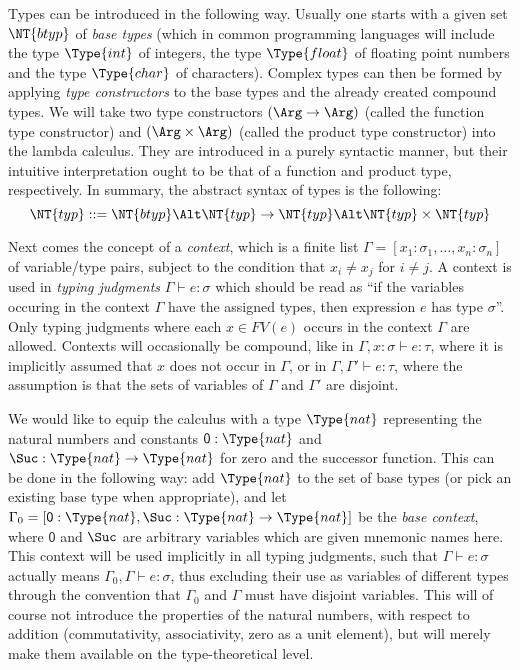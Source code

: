 Types can be introduced in the following way. Usually one starts with a given
set $\NT{btyp}$ of \emph{base types} (which in common programming languages
will include the type $\Type{int}$ of integers, the type $\Type{float}$ of floating point
numbers and the type $\Type{char}$ of characters). Complex types can then be
formed by applying \emph{type constructors} to the base types and the already
created compound types. We will take two type constructors $(\Arg \to\Arg)$
(called the function type constructor) and $(\Arg \times \Arg)$ (called
the product type constructor) into the lambda calculus. They are introduced in a
purely syntactic manner, but their intuitive interpretation ought to be that of
a function and product type, respectively. In summary, the abstract syntax of
types is the following:
\begin{equation}
\label{eq:syntax-types}
  \NT{typ} ::= \NT{btyp} \Alt \NT{typ} \to \NT{typ} \Alt \NT{typ} \times \NT{typ}
\end{equation}

Next comes the concept of a \emph{context}, which is a finite list $\Gamma =
[x_1:\sigma_1, \ldots, x_n:\sigma_n]$ of variable/type pairs, subject to the condition that
$x_i \neq x_j$ for $i \neq j$. A context is used in \emph{typing judgments} $\Gamma \vdash e :
\sigma$ which should be read as ``if the variables occuring in the context $\Gamma$
have the assigned types, then expression $e$ has type $\sigma$''. Only typing
judgments where each $x \in FV(e)$ occurs in the context $\Gamma$ are allowed. Contexts
will occasionally be compound, like in $\Gamma, x:\sigma \vdash e : \tau$, where it is implicitly
assumed that $x$ does not occur in $\Gamma$, or in $\Gamma, \Gamma' \vdash e : \tau$, where the
assumption is that the sets of variables of $\Gamma$ and $\Gamma'$ are disjoint.

We would like to equip the calculus with a type $\Type{nat}$ representing the
natural numbers and constants $\mathsf{0} : \Type{nat}$ and $\Suc : \Type{nat} \to
\Type{nat}$ for zero and the successor function. This can be done in the
following way: add $\Type{nat}$ to the set of base types (or pick an existing
base type when appropriate), and let $\Gamma_0 = [\mathsf{0} : \Type{nat}, \Suc :
\Type{nat} \to \Type{nat}]$ be the \emph{base context}, where $\mathsf{0}$ and
$\Suc$ are arbitrary variables which are given mnemonic names here. This context
will be used implicitly in all typing judgments, such that $\Gamma \vdash e : \sigma$ actually
means $\Gamma_0, \Gamma \vdash e : \sigma$, thus excluding their use as variables of different types
through the convention that $\Gamma_0$ and $\Gamma$ must have disjoint variables. This
will of course not introduce the properties of the natural numbers, \EG with respect to
addition (commutativity, associativity, zero as a unit element), but will merely
make them available on the type-theoretical level.

